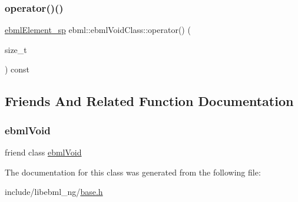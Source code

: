 \mbox{\label{classebml_1_1ebmlVoidClass_ad570c8614bf8fc88edecbbe0d3a335e6}} 
\subsubsection{\texorpdfstring{operator()()}{operator()()}}
{\footnotesize\ttfamily \mbox{\hyperlink{namespaceebml_adad533b7705a16bb360fe56380c5e7be}{ebml\+Element\+\_\+sp}} ebml\+::ebml\+Void\+Class\+::operator() (\begin{DoxyParamCaption}\item[{size\+\_\+t}]{ }\end{DoxyParamCaption}) const}



\subsection{Friends And Related Function Documentation}
\mbox{\label{classebml_1_1ebmlVoidClass_af2d556fe3de73937062cdd59bad2a1c0}} 
\subsubsection{\texorpdfstring{ebml\+Void}{ebmlVoid}}
{\footnotesize\ttfamily friend class \mbox{\hyperlink{classebml_1_1ebmlVoid}{ebml\+Void}}\hspace{0.3cm}{\ttfamily [friend]}}



The documentation for this class was generated from the following file\+:\begin{DoxyCompactItemize}
\item 
include/libebml\+\_\+ng/\mbox{\hyperlink{base_8h}{base.\+h}}\end{DoxyCompactItemize}
